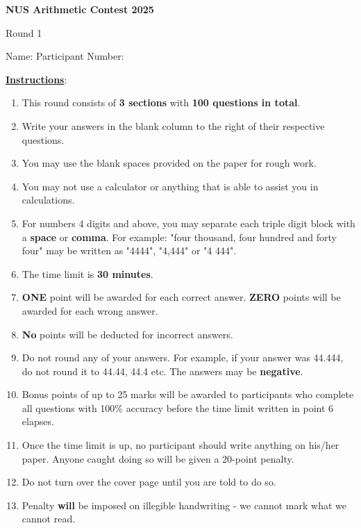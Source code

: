 \documentclass[11pt]{article}
\begin{document}
\thispagestyle{empty}
\begin{center}
{\LARGE{\bf{NUS Arithmetic Contest 2025}}}

\vspace{0.1in}
{\Large{Round 1}}
\end{center}

\vspace{0.2in}
Name: \hrulefill
\vspace{0.1in}
Participant Number: \hrulefill

\vspace{0.2in}
\underline{\textbf{Instructions}}:

\begin{enumerate}
  \item This round consists of \textbf{3 sections} with \textbf{100 questions in total}.
  \item Write your answers in the blank column to the right of their respective questions. 
  \item You may use the blank spaces provided on the paper for rough work.
  \item You may not use a calculator or anything that is able to assist you in calculations.
  \item For numbers 4 digits and above, you may separate each triple digit block with a \textbf{space} or \textbf{comma}. For example: "four thousand, four hundred and forty four" may be written as "4444", "4,444" or "4 444".
  \item The time limit is \textbf{30 minutes}.
  \item \textbf{ONE} point will be awarded for each correct answer. \textbf{ZERO} points will be awarded for each wrong answer.    
  \item {\bf No} points will be deducted for incorrect answers.
  \item Do not round any of your answers. For example, if your answer was 44.444, do not round it to 44.44, 44.4 etc. The answers may be \textbf{negative}.
  \item Bonus points of up to 25 marks will be awarded to participants who complete all questions with 100\% accuracy before the time limit written in point 6 elapses. 
  \item Once the time limit is up, no participant should write anything on his/her paper. Anyone caught doing so will be given a 20-point penalty. 
  \item Do not turn over the cover page until you are told to do so.
  \item Penalty {\bf will} be imposed on illegible handwriting - we cannot mark what we cannot read. 
\end{enumerate}
\end{document}
